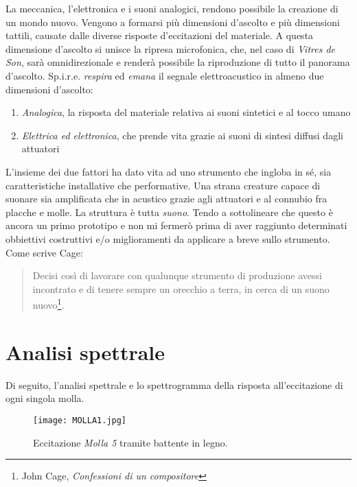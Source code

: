 La meccanica, l'elettronica e i suoni analogici, rendono possibile la creazione di un mondo nuovo. Vengono a formarsi più dimensioni d'ascolto e più dimensioni tattili, causate dalle diverse risposte d'eccitazioni del materiale. A questa dimensione d'ascolto si unisce la ripresa microfonica, che, nel caso di \textit{Vitres de Son}, sarà omnidirezionale e renderà possibile la riproduzione di tutto il panorama d'ascolto. Sp.i.r.e. \textit{respira} ed \textit{emana} il segnale elettroacustico in almeno due dimensioni d'ascolto:
\begin{enumerate}
\item{\textit{Analogica}, la risposta del materiale relativa ai suoni sintetici e al tocco umano}
\item{\textit{Elettrica ed elettronica}, che prende vita grazie ai suoni di sintesi diffusi dagli attuatori}
\end{enumerate}

L'insieme dei due fattori ha dato vita ad uno strumento che ingloba in sé, sia caratteristiche installative che performative. Una strana creature capace di suonare sia amplificata che in acustico grazie agli attuatori e al connubio fra placche e molle. La struttura è tutta \textit{suono}. Tendo a sottolineare che questo è ancora un primo prototipo e non mi fermerò prima di aver raggiunto determinati obbiettivi costruttivi e/o miglioramenti da applicare a breve sullo strumento. Come scrive Cage:

\begin{small}
\begin{quotation}
Decisi così di lavorare con qualunque strumento di produzione avessi incontrato e di tenere sempre un orecchio a terra, in cerca di un suono nuovo\footnote{John Cage, \textit{Confessioni di un compositore}}.
\end{quotation}
\end{small}

\clearpage


\section{Analisi spettrale}

Di seguito, l'analisi spettrale e lo spettrogramma della risposta all'eccitazione di ogni singola molla. 

\begin{figure}[htbp]
\begin{center}
\texttt{[image: MOLLA1.jpg]}
\caption{Eccitazione \textit{Molla 5} tramite battente in legno.}
\label{default}
\end{center}
\end{figure}


